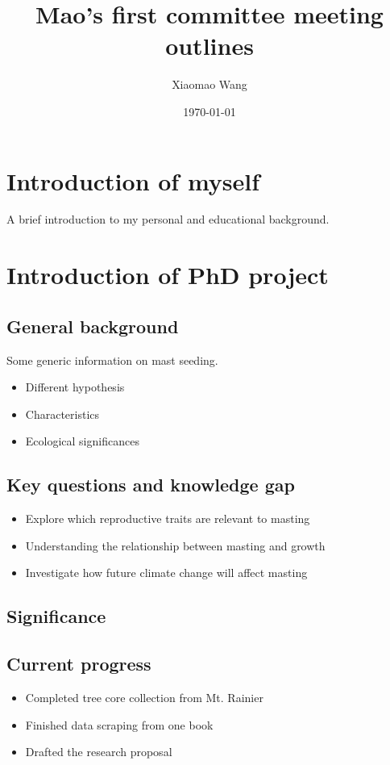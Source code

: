 \documentclass[11pt,letter]{article}
\begin{document}
\title{Mao's first committee meeting outlines}
\author{Xiaomao Wang} 
\date{\today}
\maketitle

\setlength{\parindent}{0pt}
\setlength{\parskip}{3pt}

\section{Introduction of myself}
A brief introduction to my personal and educational background.
\section{Introduction of PhD project}
\subsection{General background}
Some generic information on mast seeding.
\begin{itemize}
	\item Different hypothesis
	\item Characteristics
	\item Ecological significances
	\end{itemize}
\subsection{Key questions and knowledge gap}
 \begin{itemize}
	\item Explore which reproductive traits are relevant to masting
	\item Understanding the relationship between masting and growth
	\item Investigate how future climate change will affect masting
 \end{itemize}
\subsection{Significance}
\subsection{Current progress}
 \begin{itemize}
 	\item Completed tree core collection from Mt. Rainier
 	\item Finished data scraping from one book
 	\item Drafted the research proposal
 \end{itemize}
\end{document}
